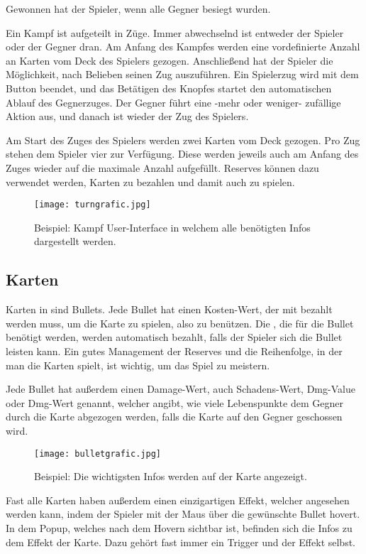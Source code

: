 Gewonnen hat der Spieler, wenn alle Gegner besiegt wurden.


Ein Kampf ist aufgeteilt in Züge. Immer abwechselnd ist entweder der Spieler oder der Gegner dran. Am Anfang des Kampfes
werden eine vordefinierte Anzahl an Karten vom Deck des Spielers gezogen.
Anschließend hat der Spieler die Möglichkeit, nach Belieben seinen Zug auszuführen. Ein Spielerzug wird mit dem 
Button beendet, und das Betätigen des Knopfes startet den automatischen Ablauf des Gegnerzuges. Der Gegner führt eine -mehr
oder weniger- zufällige Aktion aus, und danach ist wieder der Zug des Spielers.


Am Start des Zuges des Spielers werden zwei Karten vom Deck gezogen. Pro Zug stehen dem Spieler vier 
zur Verfügung. Diese werden jeweils auch am Anfang des Zuges wieder auf die maximale Anzahl aufgefüllt.
Reserves können dazu verwendet werden, Karten zu bezahlen und damit auch zu spielen.

\begin{figure}[H]
    \texttt{[image: turngrafic.jpg]}
    \caption{Beispiel: Kampf User-Interface in welchem alle benötigten Infos dargestellt werden.}
\end{figure}



\subsection{Karten}\label{Karten}
Karten in \FF sind Bullets. Jede Bullet hat einen Kosten-Wert, der mit  bezahlt werden muss, um die Karte zu spielen, also zu benützen.
Die , die für die Bullet benötigt werden, werden automatisch bezahlt, falls der Spieler sich die Bullet leisten kann.
Ein gutes Management der Reserves und die Reihenfolge, in der man die Karten spielt, ist wichtig, um das Spiel zu meistern.


Jede Bullet hat außerdem einen Damage-Wert, auch Schadens-Wert, Dmg-Value oder Dmg-Wert genannt, welcher angibt, wie viele Lebenspunkte dem Gegner
durch die Karte abgezogen werden, falls die Karte auf den Gegner geschossen wird.

\begin{figure}[H]
    \texttt{[image: bulletgrafic.jpg]}
    \caption{Beispiel: Die wichtigsten Infos werden auf der Karte angezeigt.}
\end{figure}

Fast alle Karten haben außerdem einen einzigartigen Effekt,
welcher angesehen werden kann, indem der Spieler mit der Maus über die gewünschte Bullet hovert.
In dem Popup, welches nach dem Hovern sichtbar ist, befinden sich die Infos zu dem Effekt der Karte.
Dazu gehört fast immer ein Trigger und der Effekt selbst.


